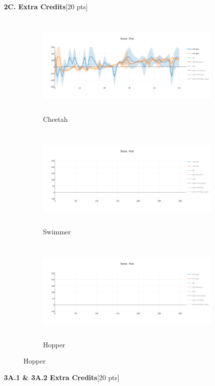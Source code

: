 \documentclass[10pt]{article}
\begin{document}
\textbf{2C. Extra Credits}[20 pts]
\begin{figure}[ht!]
    \centering
    \begin{subfigure}[h]{0.6\linewidth}
        \centering
        \includegraphics[height=2in]{figures/meppo.png}
        \caption{Cheetah}
    \end{subfigure}
    \vskip 0.3in
    \begin{subfigure}[h]{0.6\textwidth}
        \centering
        \includegraphics[height=2in]{figures/newplot.png}
        \caption{Swimmer}
    \end{subfigure}
    \vskip 0.3in
    \begin{subfigure}[h]{0.6\textwidth}
        \centering
        \includegraphics[height=2in]{figures/newplot.png}
        \caption{Hopper}
    \end{subfigure}
\end{figure}
\clearpage

\textbf{3A.1 & 3A.2 Extra Credits}[20 pts]
\end{document}
